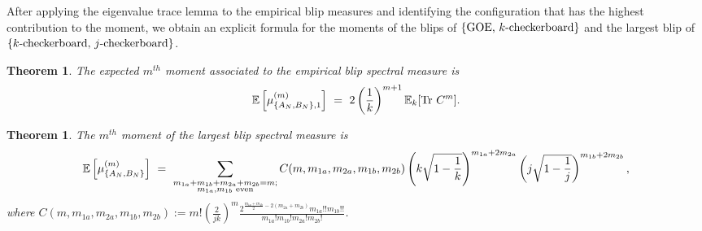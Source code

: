 \documentclass[11pt,reqno]{amsart}
\numberwithin{equation}{section}
\theoremstyle{plain}
\newtheorem{definition}[thm]{Definition}
\newtheorem{theorem}[thm]{Theorem}
\begin{document}
After applying the eigenvalue trace lemma to the empirical blip measures and identifying the configuration that has the highest contribution to the moment, we obtain an explicit formula for the moments of the blips of $\{\textup{GOE, }k\textup{-checkerboard}\}$ and the largest blip of $\{k\textup{-checkerboard, }j\textup{-checkerboard}\}$.

\begin{theorem}\label{GOE-checkerboard Moments}
The expected $m^{th}$ moment associated to the empirical blip spectral measure is
\begin{align}
\mathbb{E}\left[\mu_{\{A_N,B_N\},1}^{(m)}\right] \ = \ 2\left(\frac{1}{k}\right)^{m+1}\mathbb{E}_k[\textup{Tr }C^m].
\end{align}
\end{theorem}

\begin{theorem}
The $m^{th}$ moment of the largest blip spectral measure is 
\begin{align*}
\mathbb{E}\left[\mu_{\{A_N,B_N\}}^{(m)}\right] \ = \ \sum_{\substack{m_{1a}+m_{1b}+m_{2a}+m_{2b}=m; \\ m_{1a},m_{1b}\textup{ even}}}C(m, m_{1a}, m_{2a}, m_{1b}, m_{2b})\left(k\sqrt{1-\frac{1}{k}}\right)^{m_{1a}+2m_{2a}}\left(j\sqrt{1-\frac{1}{j}}\right)^{m_{1b}+2m_{2b}},
\end{align*}
where $C(m, m_{1a}, m_{2a}, m_{1b}, m_{2b}):=m!\left(\frac{2}{jk}\right)^m\frac{ 2^{\frac{m_{1a}+m_{1b}}{2}-2(m_{2a}+m_{2b})}m_{1a}!!m_{1b}!!}{m_{1a}!m_{1b}!m_{2a}!m_{2b}!}$.
\end{theorem}



\end{document}

